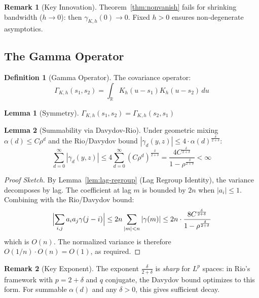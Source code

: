 \documentclass[final,3p,twocolumn,times,authoryear]{elsarticle}
\theoremstyle{definition}
\newtheorem{definition}{Definition}[section]
\newtheorem{lemma}{Lemma}[section]
\newtheorem{remark}{Remark}[section]
\begin{document}
\begin{remark}[Key Innovation]
Theorem~\ref{thm:nonvanish} fails for shrinking bandwidth ($h \to 0$): then $\gamma_{K,h}(0) \to 0$. Fixed $h > 0$ ensures non-degenerate asymptotics.
\end{remark}

\subsection{The Gamma Operator}

\begin{definition}[Gamma Operator]
\label{def:gamma-op}
The covariance operator:
\begin{equation}
\Gamma_{K,h}(s_1, s_2) = \int_{\mathbb{R}} K_h(u - s_1) K_h(u - s_2) \, du
\end{equation}
\end{definition}

\begin{lemma}[Symmetry]
$\Gamma_{K,h}(s_1, s_2) = \Gamma_{K,h}(s_2, s_1)$
\end{lemma}

\begin{lemma}[Summability via Davydov-Rio]
\label{lem:summable-davydov}
Under geometric mixing $\alpha(d) \leq C\rho^d$ and the Rio/Davydov bound $|\gamma_d(y,z)| \leq 4 \cdot \alpha(d)^{\frac{\delta}{2+\delta}}$:
\begin{equation}
\label{eq:summability-bound}
\sum_{d=0}^\infty |\gamma_d(y,z)| \leq 4 \sum_{d=0}^\infty (C\rho^d)^{\frac{\delta}{2+\delta}} = \frac{4 C^{\frac{\delta}{2+\delta}}}{1 - \rho^{\frac{\delta}{2+\delta}}} < \infty
\end{equation}
\end{lemma}

\begin{proof}[Proof Sketch]
By Lemma~\ref{lem:lag-regroup} (Lag Regroup Identity), the variance decomposes by lag. The coefficient at lag $m$ is bounded by $2n$ when $|a_i| \leq 1$. Combining with the Rio/Davydov bound:
\begin{equation}
\Bigl|\sum_{i,j} a_i a_j \gamma(j-i)\Bigr| \leq 2n \sum_{|m| < n} |\gamma(m)| \leq 2n \cdot \frac{8 C^{\frac{\delta}{2+\delta}}}{1 - \rho^{\frac{\delta}{2+\delta}}}
\end{equation}
which is $O(n)$. The normalized variance is therefore $O(1/n) \cdot O(n) = O(1)$, as required.
\end{proof}

\begin{remark}[Key Exponent]
The exponent $\frac{\delta}{2+\delta}$ is \emph{sharp} for $L^p$ spaces: in Rio's framework with $p = 2+\delta$ and $q$ conjugate, the Davydov bound optimizes to this form. For summable $\alpha(d)$ and any $\delta > 0$, this gives sufficient decay.
\end{remark}
\end{document}
